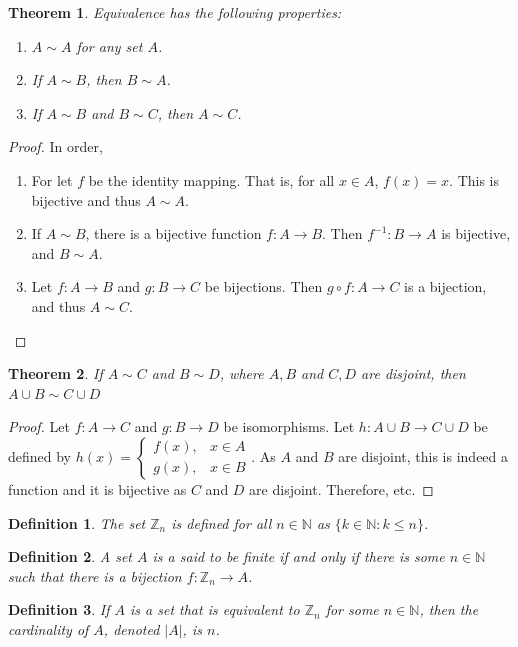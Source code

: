 \documentclass[12pt,oneside]{book}
\theoremstyle{mystyle}
\newtheorem{theorem}{Theorem}[section]
\newtheorem{definition}{Definition}[section]
\begin{document}
\begin{theorem}
Equivalence has the following properties:
\begin{enumerate}
\item $A\sim A$ for any set $A$.
\item If $A\sim B$, then $B\sim A$.
\item If $A\sim B$ and $B\sim C$, then $A\sim C$.
\end{enumerate}
\end{theorem}
\begin{proof}
In order,
\begin{enumerate}
\item For let $f$ be the identity mapping. That is, for all $x\in A$, $f(x) = x$. This is bijective and thus $A\sim A$.
\item If $A\sim B$, there is a bijective function $f:A\rightarrow B$. Then $f^{-1}:B\rightarrow A$ is bijective, and $B\sim A$.
\item Let $f:A\rightarrow B$ and $g:B\rightarrow C$ be bijections. Then $g\circ f:A\rightarrow C$ is a bijection, and thus $A\sim C$.
\end{enumerate}
\end{proof}

\begin{theorem}
If $A\sim C$ and $B\sim D$, where $A,B$ and $C,D$ are disjoint, then $A\cup B \sim C\cup D$
\end{theorem}
\begin{proof}
Let $f:A\rightarrow C$ and $g:B\rightarrow D$ be isomorphisms. Let $h:A\cup B \rightarrow C\cup D$ be defined by $h(x) = \begin{cases} f(x), & x\in A\\ g(x), & x\in B\end{cases}$. As $A$ and $B$ are disjoint, this is indeed a function and it is bijective as $C$ and $D$ are disjoint. Therefore, etc.
\end{proof}

\begin{definition}
The set $\mathbb{Z}_n$ is defined for all $n\in \mathbb{N}$ as $\{k\in \mathbb{N}: k\leq n\}$.
\end{definition}

\begin{definition}
A set $A$ is a said to be finite if and only if there is some $n\in \mathbb{N}$ such that there is a bijection $f:\mathbb{Z}_n \rightarrow A$.
\end{definition}

\begin{definition}
If $A$ is a set that is equivalent to $\mathbb{Z}_n$ for some $n\in \mathbb{N}$, then the cardinality of $A$, denoted $|A|$, is $n$.
\end{definition}
\end{document}
